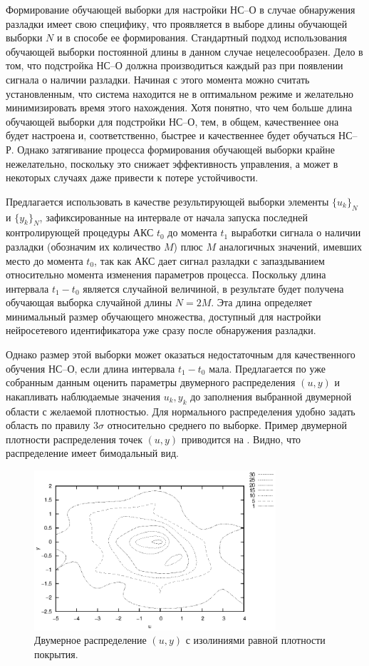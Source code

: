Формирование обучающей выборки для настройки НС--О в случае обнаружения
разладки имеет свою специфику, что проявляется в выборе длины
обучающей выборки $N$ и в способе ее формирования. Стандартный подход
использования обучающей выборки постоянной длины в данном случае
нецелесообразен.  Дело в том, что подстройка НС--О должна производиться
каждый раз при появлении сигнала о наличии разладки.  Начиная с этого
момента можно считать установленным, что система находится не в
оптимальном режиме и желательно минимизировать время этого нахождения.
Хотя понятно, что чем больше длина обучающей выборки для подстройки
НС--О, тем, в общем, качественнее она будет настроена и,
соответственно, быстрее и качественнее будет обучаться НС--Р.  Однако
затягивание процесса формирования обучающей выборки крайне
нежелательно, поскольку это снижает эффективность управления, а может
в некоторых случаях даже привести к потере устойчивости.

Предлагается использовать в качестве результирующей выборки элементы
$\{u_k\}_N$ и $\{y_k\}_N$, зафиксированные на интервале от начала
запуска последней контролирующей процедуры АКС $t_0$ до момента $t_1$
выработки сигнала о наличии разладки (обозначим их количество $M$)
плюс $M$ аналогичных значений, имевших место до момента $t_0$, так как
АКС дает сигнал разладки с запаздыванием относительно момента
изменения параметров процесса.  Поскольку длина интервала $t_1-t_0$
является случайной величиной, в результате будет получена обучающая
выборка случайной длины $N=2M$.  Эта длина определяет минимальный
размер обучающего множества, доступный для настройки нейросетевого
идентификатора уже сразу после обнаружения разладки.

Однако размер этой выборки может оказаться недостаточным для
качественного обучения НС--О, если длина интервала $t_1-t_0$ мала.
Предлагается по уже собранным данным оценить параметры двумерного
распределения $(u,y)$ и накапливать наблюдаемые значения $u_k,y_k$ до
заполнения выбранной двумерной области с желаемой плотностью.  Для
нормального распределения удобно задать область по правилу $3\sigma$
относительно среднего по выборке.  Пример двумерной плотности
распределения точек $(u,y)$ приводится на .
Видно, что распределение имеет бимодальный вид.

\begin{figure}[h]
\centering
\includegraphics[width=0.8\textwidth,%
  totalheight=0.4\textheight]{u_ny_d2d_ru}
\caption{Двумерное распределение $(u,y)$ с изолиниями равной плотности
  покрытия.}
\label{fig:u_ny_d2d_ru}
\end{figure}

